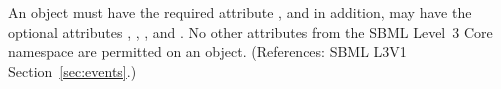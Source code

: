 An \Event object must have the required attribute
, and in addition, may have the optional
attributes  , , , and .
No other attributes from the SBML Level~3 Core namespace are permitted on
an \Event object.  (References: SBML L3V1 Section~\ref{sec:events}.)
